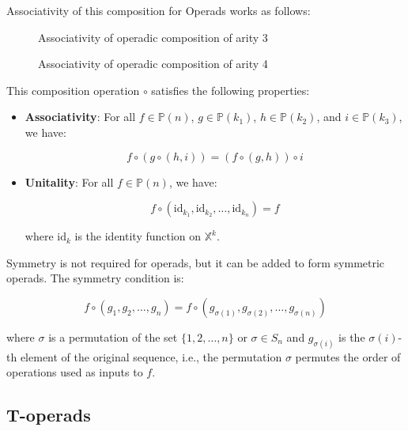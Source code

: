Associativity of this composition for Operads works as follows:

\begin{figure}[h]
\centering
    
    \caption{Associativity of operadic composition of arity 3}
\end{figure}

\begin{figure}[h]
\centering

\caption{Associativity of operadic composition of arity 4}
\label{fig:arity-4-associativity}
\end{figure}

This composition operation $\circ$ satisfies the following properties:

\begin{itemize}
  \item \textbf{Associativity}: For all $f \in \mathbb{P}(n)$, $g \in \mathbb{P}(k_1)$, $h \in \mathbb{P}(k_2)$, and $i \in \mathbb{P}(k_3)$, we have:

  \begin{equation}
    f \circ (g \circ (h, i)) = (f \circ (g, h)) \circ i
  \end{equation}

  \item \textbf{Unitality}: For all $f \in \mathbb{P}(n)$, we have:

  \begin{equation}
    f \circ (\text{id}_{k_1}, \text{id}_{k_2}, \ldots, \text{id}_{k_n}) = f
  \end{equation}

  where $\text{id}_k$ is the identity function on $\mathbb{X}^k$.
\end{itemize}

Symmetry is not required for operads, but it can be added to form symmetric operads. The symmetry condition is:

\begin{equation}
  f \circ (g_1, g_2, \ldots, g_n) = f \circ (g_{\sigma(1)}, g_{\sigma(2)}, \ldots, g_{\sigma(n)})
\end{equation}

where $\sigma$ is a permutation of the set $\{1, 2, \ldots, n\}$ or $\sigma \in S_n$ and $g_{\sigma(i)}$ is the $\sigma(i)$-th element of the original sequence, i.e., the permutation $\sigma$ permutes the order of operations used as inputs to $f$.

\subsection{T-operads}

